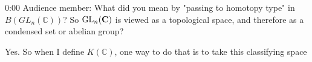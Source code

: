 \begin{unfinished}{0:00}
Audience member: What did you mean by "passing to homotopy type" in $B(GL_n(\mathbb{C}))$? So $\operatorname{GL}_n(\mathbf C)$ is viewed as a topological space, and therefore as a condensed set or abelian group?

Yes. So when I define $K(\mathbb{C})$, one way to do that is to take this classifying space
\end{unfinished}